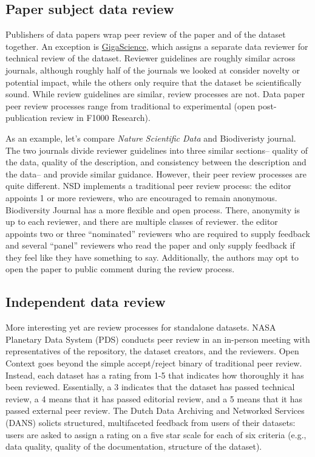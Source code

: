 \documentclass[10pt,a4paper,twocolumn]{article}
\begin{document}
\subsection*{Paper subject data review}
Publishers of data papers wrap peer review of the paper and of the dataset together. 
An exception is \href{http://www.gigasciencejournal.com/}{GigaScience}, which assigns a separate data reviewer for technical review of the dataset. 
Reviewer guidelines are roughly similar across journals, although roughly half of the journals we looked at consider novelty or potential impact, while the others only require that the dataset be scientifically sound.
While review guidelines are similar, review processes are not. 
Data paper peer review processes range from traditional to experimental (open post-publication review in F1000 Research).

As an example, let's compare \emph{Nature Scientific Data} and Biodiveristy journal.
The two journals divide reviewer guidelines into three similar sections– quality of the data, quality of the description, and consistency between the description and the data– and provide similar guidance.
However, their peer review processes are quite different.
NSD implements a traditional peer review process: the editor appoints 1 or more reviewers, who are encouraged to remain anonymous.
Biodiversity Journal has a more flexible and open process.
There, anonymity is up to each reviewer, and there are multiple classes of reviewer.
the editor appoints two or three ``nominated'' reviewers who are required to supply feedback and several ``panel'' reviewers who read the paper and only supply feedback if they feel like they have something to say.
Additionally, the authors may opt to open the paper to public comment during the review process.


\subsection*{Independent data review}
More interesting yet are review processes for standalone datasets. 
NASA Planetary Data System (PDS)\cite{nasa_pds} conducts peer review in an in-person meeting with representatives of the repository, the dataset creators, and the reviewers. 
Open Context goes beyond the simple accept/reject binary of traditional peer review. 
Instead, each dataset has a rating from 1-5 that indicates how thoroughly it has been reviewed. 
Essentially, a 3 indicates that the dataset has passed technical review, a 4 means that it has passed editorial review, and a 5 means that it has passed external peer review. 
The Dutch Data Archiving and Networked Services (DANS) solicts structured, multifaceted feedback from users of their datasets: users are asked to assign a rating on a five star scale for each of six criteria (e.g., data quality, quality of the documentation, structure of the dataset).\cite{grootveld_data_2011} 
\end{document}

